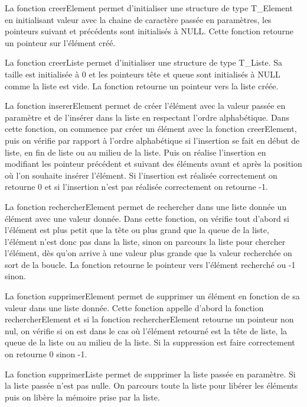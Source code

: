 \documentclass[11pt]{report}
\begin{document}
La fonction creerElement permet d'initialiser une structure de type T\_Element en initialisant valeur avec la chaine de caractère passée en paramètres, les pointeurs suivant et précédents sont initialisés à NULL. Cette fonction retourne un pointeur sur l’élément créé.

\medskip

La fonction creerListe permet d’initialiser une structure de type T\_Liste. Sa taille est initialisée à 0 et les pointeurs tête et queue sont initialisés à NULL comme la liste est vide. La fonction retourne un pointeur vers la liste créée. 

\medskip

La fonction insererElement permet de créer l’élément avec la valeur passée en paramètre et de l'insérer dans la liste en respectant l'ordre alphabétique. Dans cette fonction, on commence par créer un élément avec la fonction creerElement, puis on vérifie par rapport à l'ordre alphabétique si l'insertion se fait en début de liste, en fin de liste ou au milieu de la liste. Puis on réalise l'insertion en modifiant les pointeur précédent et suivant des éléments avant et après la position où l'on souhaite insérer l'élément. 
Si l'insertion est réalisée correctement on retourne 0 et si l'insertion n'est pas réalisée correctement on retourne -1.

\medskip

La fonction rechercherElement permet de rechercher dans une liste donnée un élément avec une valeur donnée. Dans cette fonction, on vérifie tout d'abord si l’élément est plus petit que la tête ou plus grand que la queue de la liste, l'élément n'est donc pas dans la liste, sinon on parcours la liste pour chercher l'élément, dès qu'on arrive à une valeur plus grande que la valeur recherchée on sort de la boucle. La fonction retourne le pointeur vers l'élément recherché ou -1 sinon. 

\medskip

La fonction supprimerElement permet de supprimer un élément en fonction de sa valeur dans une liste donnée. Cette fonction appelle d'abord la fonction rechercherElement et si la fonction rechercherElement retourne un pointeur non nul, on vérifie si on est dans le cas où l'élément retourné est la tête de liste, la queue de la liste ou au milieu de la liste. 
Si la suppression est faire correctement on retourne 0 sinon -1. 

\medskip

La fonction supprimerListe permet de supprimer la liste passée en paramètre. Si la liste passée n'est pas nulle. On parcours toute la liste pour libérer les éléments puis on libère la mémoire prise par la liste. 
\end{document}
